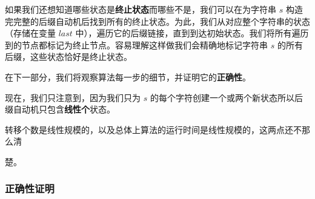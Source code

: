 如果我们还想知道哪些状态是\textbf{终止状态}而哪些不是，我们可以在为字符串 $s$ 构造完完整的后缀自动机后找到所有的终止状态。为此，我们从对应整个字符串的状态（存储在变量 $last$ 中），遍历它的后缀链接，直到到达初始状态。我们将所有遍历到的节点都标记为终止节点。容易理解这样做我们会精确地标记字符串 $s$ 的所有后缀，这些状态恰好是终止状态。

在下一部分，我们将观察算法每一步的细节，并证明它的\textbf{正确性}。

现在，我们只注意到，因为我们只为 $s$ 的每个字符创建一个或两个新状态所以后缀自动机只包含\textbf{线性个}状态。

转移个数是线性规模的，以及总体上算法的运行时间是线性规模的，这两点还不那么清

楚。

\subsubsection{正确性证明}

